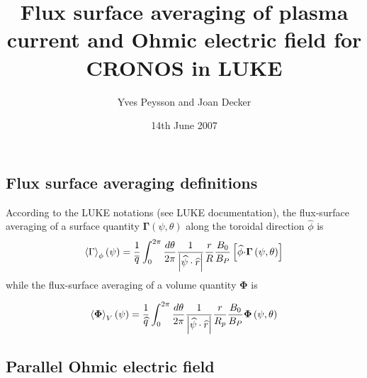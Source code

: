 \documentclass[12pt,a4paper]{article}
\begin{document}
\author{Yves Peysson and Joan Decker}
\title{Flux surface averaging of plasma current and Ohmic electric field for CRONOS in LUKE}
\date{14th June 2007}
\maketitle

\subsection{\protect\bigskip Flux surface averaging definitions}

According to the LUKE notations (see LUKE documentation), the flux-surface averaging of a surface
quantity $\mathbf{\Gamma }\left( \psi ,\theta \right) $ along the toroidal
direction $\widehat{\phi }$ is 
\begin{equation}
\left\langle \Gamma \right\rangle _{\phi }\left( \psi \right) =\frac{1}{%
\overline{q}}\int_{0}^{2\pi }\frac{d\theta }{2\pi }\frac{1}{\left\vert 
\widehat{\psi }\cdot \widehat{r}\right\vert }\frac{r}{R}\frac{B_{0}}{B_{P}}%
\left[ \widehat{\phi }\mathbf{\cdot \Gamma }\left( \psi ,\theta \right) %
\right] 
\end{equation}%
while the flux-surface averaging of a volume quantity $\mathbf{\Phi }$ is 

\begin{equation}
\left\langle \mathbf{\Phi }\right\rangle _{V}\left( \psi \right) =\frac{1}{%
\widehat{q}}\int_{0}^{2\pi }\frac{d\theta }{2\pi }\frac{1}{\left\vert 
\widehat{\psi }\cdot \widehat{r}\right\vert }\frac{r}{R_{p}}\frac{B_{0}}{%
B_{P}}\mathbf{\Phi }\left( \psi ,\theta \right) 
\end{equation}

\subsection{Parallel Ohmic electric field}
\end{document}
